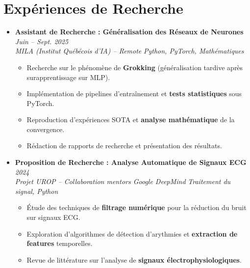 \documentclass[a4paper,11pt]{article}
\begin{document}
\section{Expériences de Recherche}
\begin{itemize}[leftmargin=*, label={-}]

\item \textbf{Assistant de Recherche : Généralisation des Réseaux de Neurones} \hfill \textit{Juin -- Sept. 2025} \\
\textit{MILA (Institut Québécois d'IA) -- Remote} \hfill \textit{Python, PyTorch, Mathématiques}
\vspace{-2pt}
    \begin{itemize}[leftmargin=0.4cm, nosep, label=\tiny$\bullet$]
        \item \small{Recherche sur le phénomène de \textbf{Grokking} (généralisation tardive après surapprentissage sur MLP).}
        \item \small{Implémentation de pipelines d'entraînement et \textbf{tests statistiques} sous PyTorch.}
        \item \small{Reproduction d'expériences SOTA et \textbf{analyse mathématique} de la convergence.}
        \item \small{Rédaction de rapports de recherche et présentation des résultats.}
    \end{itemize}
\vspace{6pt}

\item \textbf{Proposition de Recherche : Analyse Automatique de Signaux ECG} \hfill \textit{2024} \\
\textit{Projet UROP -- Collaboration mentors Google DeepMind} \hfill \textit{Traitement du signal, Python}
\vspace{-2pt}
    \begin{itemize}[leftmargin=0.4cm, nosep, label=\tiny$\bullet$]
        \item \small{Étude des techniques de \textbf{filtrage numérique} pour la réduction du bruit sur signaux ECG.}
        \item \small{Exploration d'algorithmes de détection d'arythmies et \textbf{extraction de features} temporelles.}
        \item \small{Revue de littérature sur l'analyse de \textbf{signaux électrophysiologiques}.}
    \end{itemize}
\vspace{6pt}


\end{itemize}
\end{document}
